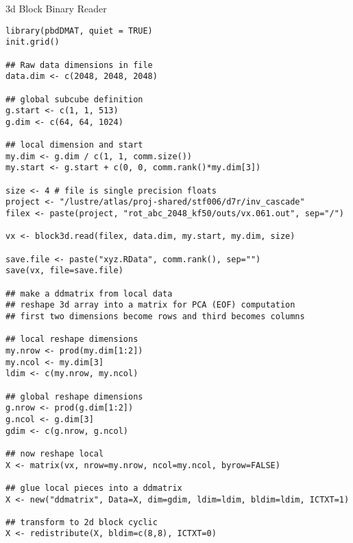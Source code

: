\begin{frame}{3d Block Binary Reader}
    \begin{lstlisting}
library(pbdDMAT, quiet = TRUE)
init.grid()

## Raw data dimensions in file
data.dim <- c(2048, 2048, 2048)

## global subcube definition
g.start <- c(1, 1, 513)
g.dim <- c(64, 64, 1024)

## local dimension and start
my.dim <- g.dim / c(1, 1, comm.size())
my.start <- g.start + c(0, 0, comm.rank()*my.dim[3])

size <- 4 # file is single precision floats
project <- "/lustre/atlas/proj-shared/stf006/d7r/inv_cascade"
filex <- paste(project, "rot_abc_2048_kf50/outs/vx.061.out", sep="/")

vx <- block3d.read(filex, data.dim, my.start, my.dim, size)

save.file <- paste("xyz.RData", comm.rank(), sep="")
save(vx, file=save.file)

## make a ddmatrix from local data
## reshape 3d array into a matrix for PCA (EOF) computation
## first two dimensions become rows and third becomes columns

## local reshape dimensions
my.nrow <- prod(my.dim[1:2])
my.ncol <- my.dim[3]
ldim <- c(my.nrow, my.ncol)

## global reshape dimensions
g.nrow <- prod(g.dim[1:2])
g.ncol <- g.dim[3]
gdim <- c(g.nrow, g.ncol)

## now reshape local
X <- matrix(vx, nrow=my.nrow, ncol=my.ncol, byrow=FALSE)

## glue local pieces into a ddmatrix
X <- new("ddmatrix", Data=X, dim=gdim, ldim=ldim, bldim=ldim, ICTXT=1)

## transform to 2d block cyclic
X <- redistribute(X, bldim=c(8,8), ICTXT=0)
    \end{lstlisting}
\end{frame}

